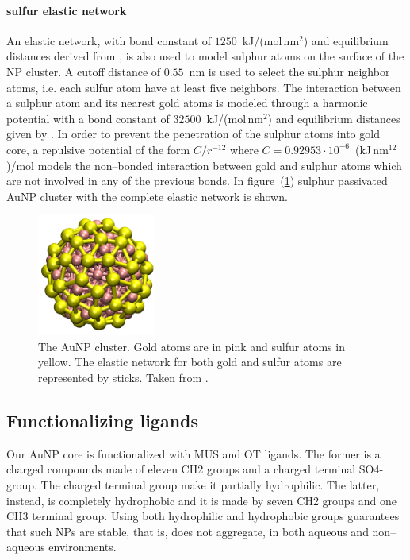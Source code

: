 \paragraph{\textbf{sulfur elastic network}} An elastic network, with bond constant of $1250$~kJ/(mol\,nm$^2$) and equilibrium distances derived from \cite{clusterEquilibrium}, is also used to model sulphur atoms on the surface of the \ac{NP} cluster. A cutoff distance of $0.55$~nm is used to select the sulphur neighbor atoms, i.e. each sulfur atom have at least five neighbors. The interaction between a sulphur atom and its nearest gold atoms is modeled through a harmonic potential with a bond constant of $32500$~kJ/(mol\,nm$^2$) and equilibrium distances given by \cite{clusterEquilibrium}. In order to prevent the penetration of the sulphur atoms into gold core, a repulsive potential of the form $C/r^{-12}$ where $C = 0.92953\cdot 10^{-6}$~(kJ\,nm$^{12}$)/mol models the non--bonded interaction between gold and sulphur atoms which are not involved in any of the previous bonds. In figure~(\ref{fig:NPCluster}) sulphur passivated \ac{AuNP} cluster with the complete elastic network is shown. 
\begin{figure}
	\centering
	\includegraphics[width=0.35\textwidth]{./img/NPCluster}
	\caption{The \acs{AuNP} cluster. Gold atoms are in pink and sulfur atoms in yellow. The elastic network for both gold and sulfur atoms are represented by sticks. Taken from \cite{ourPaper}.}
	\label{fig:NPCluster}
\end{figure}

\subsection{Functionalizing ligands}
Our \ac{AuNP} core is functionalized with \ac{MUS} and \ac{OT} ligands. The former is a charged compounds made of eleven \ac{CH2} groups and a charged terminal \ac{SO4-} group. The charged terminal group make it partially hydrophilic. The latter, instead, is completely hydrophobic and it is made by seven \ac{CH2} groups and one \ac{CH3} terminal group. Using both hydrophilic and hydrophobic groups guarantees that such \acp{NP} are stable, that is, does not aggregate, in both aqueous and non--aqueous environments.

